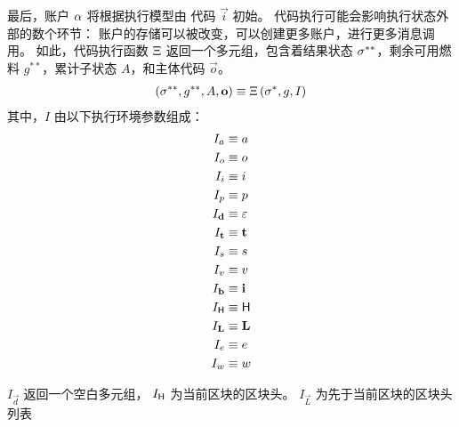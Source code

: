 最后，账户 $\mathbf{\alpha}$ 将根据执行模型由 \cvm 代码 $\vec{i}$ 初始。
代码执行可能会影响执行状态外部的数个环节：
账户的存储可以被改变，可以创建更多账户，进行更多消息调用。
如此，代码执行函数 $\mathrm{\Xi}$ 返回一个多元组，包含着结果状态 $\mathbf{\sigma}^{**}$，剩余可用燃料 $g^{**}$，累计子状态 $A$，和主体代码 $\vec{o}$。
\begin{align}
	\left(\mathbf{\sigma}^{**}, g^{**},  A, \mathbf{o} \right) \equiv \mathrm{\Xi}\left(\mathbf{\sigma}^*, g, I\right)
\end{align}
其中，$I$ 由以下执行环境参数组成：
\begin{align}
	I_a &\equiv a\\
	I_o &\equiv o\\
	I_i &\equiv i\\
	I_p &\equiv p\\
	I_{\mathbf{d}} &\equiv \mathbb{\varepsilon}\\
	I_{\mathbf{t}} & \equiv \mathbf{t}\\
	I_s &\equiv s\\
	I_v &\equiv v\\
	I_{\mathbf{b}} &\equiv \mathbf{i}\\
	I_{\textsf{H}} & \equiv \textsf{H} \\
	I_{\mathbf{L}} & \equiv \mathbf{L} \\ 
	I_e &\equiv e\\
	I_w &\equiv w
\end{align}

$I_{\vec{d}}$ 返回一个空白多元组，
$I_{\textsf{H}}$ 为当前区块的区块头。
$I_\vec{L}$ 为先于当前区块的区块头列表

